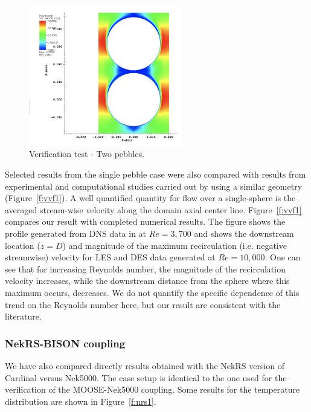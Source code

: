 \begin{figure}[!h]
\centering
\includegraphics[clip=true,width=0.6\textwidth]{Figures/pb_vv2}
\caption{Verification test - Two pebbles.}
\label{f:vvf2}
\end{figure}

Selected results from the single pebble case were also compared with results from experimental and computational studies carried out by using a similar geometry (Figure~\ref{f:vvf1}). A well quantified quantity for flow over a single-sphere is the averaged stream-wise velocity along the domain axial center line. Figure~\ref{f:vvf1} compares our result with completed numerical results. The figure shows the profile generated from DNS data in \cite{fick2017investigation} at $Re = 3,700$ and shows the downstream location ($z=D$) and magnitude of the maximum recirculation (i.e. negative streamwise) velocity for LES and DES data generated at $Re = 10,000$. One can see that for increasing Reynolds number, the magnitude of the recirculation velocity increases, while the downstream distance from the sphere where this maximum occurs, decreases. We do not quantify the specific dependence of this trend on the Reynolds number here, but our result are consistent with the literature.

\subsubsection{NekRS-BISON coupling}

We have also compared directly results obtained with the NekRS version of Cardinal versus Nek5000. The case setup is identical to the one used for the verification of the MOOSE-Nek5000 coupling. Some results for the temperature distribution are shown in Figure~\ref{f:nrs1}.

